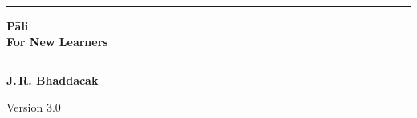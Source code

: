 \begin{titlepage}
\setcounter{page}{1}
\noindent\rule[6mm]{\linewidth}{0.7mm}
{\noindent\fontsize{60pt}{60pt}\upshape\bfseries Pāli}\\[1\baselineskip]
{\noindent\fontsize{32pt}{32pt}\upshape\bfseries For New Learners}\\[0.7\baselineskip]
\rule{\linewidth}{0.7mm}
\begin{flushright}
{\Large\bfseries J.\,R. Bhaddacak}\par
{}
{\noindent\ttfamily Version 3.0}\\
\end{flushright}
\end{titlepage}
\endinput
